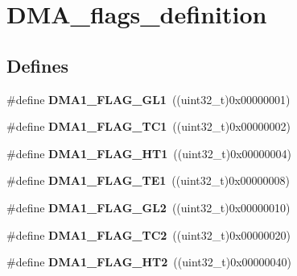 \hypertarget{group__DMA__flags__definition}{
\section{DMA\_\-flags\_\-definition}
\label{group__DMA__flags__definition}
}
\subsection*{Defines}
\begin{DoxyCompactItemize}
\item 
\hypertarget{group__DMA__flags__definition_gad1ac00f031065682ac125f6f9be061e6}{
\#define {\bfseries DMA1\_\-FLAG\_\-GL1}~((uint32\_\-t)0x00000001)}
\label{group__DMA__flags__definition_gad1ac00f031065682ac125f6f9be061e6}

\item 
\hypertarget{group__DMA__flags__definition_gaa9b4d1112bcfd34136007b813a11187e}{
\#define {\bfseries DMA1\_\-FLAG\_\-TC1}~((uint32\_\-t)0x00000002)}
\label{group__DMA__flags__definition_gaa9b4d1112bcfd34136007b813a11187e}

\item 
\hypertarget{group__DMA__flags__definition_ga9c806b96cfdcebddb64f70d13ad32270}{
\#define {\bfseries DMA1\_\-FLAG\_\-HT1}~((uint32\_\-t)0x00000004)}
\label{group__DMA__flags__definition_ga9c806b96cfdcebddb64f70d13ad32270}

\item 
\hypertarget{group__DMA__flags__definition_gae30157801ac1460dab86a8f54cfd3479}{
\#define {\bfseries DMA1\_\-FLAG\_\-TE1}~((uint32\_\-t)0x00000008)}
\label{group__DMA__flags__definition_gae30157801ac1460dab86a8f54cfd3479}

\item 
\hypertarget{group__DMA__flags__definition_gad27b8a0cf554638d78fb67a010c0419b}{
\#define {\bfseries DMA1\_\-FLAG\_\-GL2}~((uint32\_\-t)0x00000010)}
\label{group__DMA__flags__definition_gad27b8a0cf554638d78fb67a010c0419b}

\item 
\hypertarget{group__DMA__flags__definition_ga0eff24f7e6b2b874328d531ee9315b20}{
\#define {\bfseries DMA1\_\-FLAG\_\-TC2}~((uint32\_\-t)0x00000020)}
\label{group__DMA__flags__definition_ga0eff24f7e6b2b874328d531ee9315b20}

\item 
\hypertarget{group__DMA__flags__definition_gae154ffd90ebaec11f9ed1be00e69f149}{
\#define {\bfseries DMA1\_\-FLAG\_\-HT2}~((uint32\_\-t)0x00000040)}
\label{group__DMA__flags__definition_gae154ffd90ebaec11f9ed1be00e69f149}


\end{DoxyCompactItemize}
